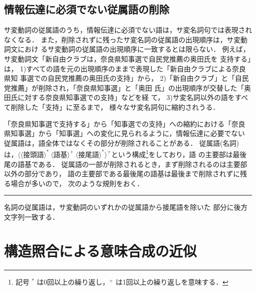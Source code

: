\subsection{情報伝達に必須でない従属語の削除}

サ変動詞の従属語のうち，情報伝達に必須でない語は，サ変名詞句では表現され
なくなる．
また，削除されずに残ったサ変名詞の従属語の出現順序は，サ変動詞文におけ
るサ変動詞の従属語の出現順序に一致するとは限らない．
例えば，サ変動詞文「新自由クラブは，奈良県知事選で自民党推薦の奥田氏を
支持する」は，
1)すべての語を元の出現順序のままで表現した「新自由クラブによる奈良県知
事選での自民党推薦の奥田氏の支持」から，
2)「新自由クラブ」と「自民党推薦」が削除され，「奈良県知事選」と「奥田
氏」の出現順序が交替した「奥田氏に対する奈良県知事選での支持」などを経
て，
3)サ変名詞以外の語をすべて削除した「支持」に至るまで，
様々なサ変名詞句に縮約されうる．

「奈良県知事選で支持する」から「知事選での支持」への縮約における「奈良
県知事選」から「知事選」への変化に見られるように，情報伝達に必要でない
従属語は，語全体ではなくその部分が削除されることがある．
従属語(名詞)は，$\langle\langle 接頭語\rangle^*\ \langle 語基
\rangle^+\ \langle 接尾語\rangle^*\rangle^+$という構成\footnote{記号 ${}^*$
は0回以上の繰り返し，${}^+$ は1回以上の繰り返しを意味する．}をしており，語
の主要部は最後尾の語基である．
従属語の一部が削除されるとき，まず削除されるのは主要部以外の部分であり，
語の主要部である最後尾の語基は最後まで削除されずに残る場合が多いので，
次のような規則をおく．
\begin{RULE}
\rule サ変名詞の従属語は，サ変動詞のいずれかの従属語から接尾語を除いた
部分に後方文字列一致する．
\label{RULE:stringmatch} 
\end{RULE}

\vspace*{-1mm}
\section{構造照合による意味合成の近似}
\label{sec:matching}


